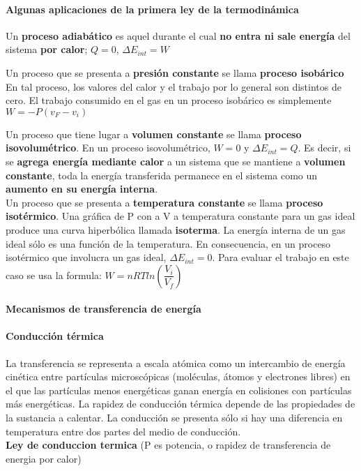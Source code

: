 \documentclass[10pt]{article}
\begin{document}
\paragraph{Algunas aplicaciones de la primera ley de la termodinámica}

Un \textbf{proceso adiabático} es aquel durante el cual \textbf{no entra ni sale energía} del sistema \textbf{por calor}; $Q = 0$, $\Delta E_{int} = W$\\
\linebreak

Un proceso que se presenta a \textbf{presión constante} se llama \textbf{proceso isobárico} En tal proceso, los valores del calor y el trabajo por lo general son distintos de cero. El trabajo consumido en el gas en un proceso isobárico es simplemente $W = -P(v_F - v_i)$\\
\linebreak

Un proceso que tiene lugar a \textbf{volumen constante} se llama \textbf{proceso isovolumétrico}. En un proceso isovolumétrico,
$W = 0$ y $\Delta E_{int} = Q$. Es decir, si se \textbf{agrega energía mediante calor} a un sistema que se mantiene a \textbf{volumen constante}, toda la energía transferida permanece en el sistema como un \textbf{aumento en su energía interna}.\\
\linebreak
Un proceso que se presenta a \textbf{temperatura constante} se llama \textbf{proceso isotérmico}. Una gráfica de P con a V a temperatura constante para un gas ideal produce una curva hiperbólica llamada \textbf{isoterma}. La energía interna de un gas ideal sólo es una función de la temperatura. En consecuencia, en un proceso isotérmico que involucra un gas ideal,
$\Delta E_{int}=0$. Para evaluar el trabajo en este caso se usa la formula: $W = n RT ln\left( \dfrac{V_i}{V_f} \right)$

\paragraph{Mecanismos de transferencia de energía}

\paragraph{Conducción térmica}

La transferencia se representa a escala atómica como un intercambio de energía cinética entre partículas microscópicas (moléculas, átomos y electrones libres) en el que las partículas menos energéticas ganan energía en colisiones con partículas más energéticas. La rapidez de conducción térmica depende de las propiedades de la sustancia a calentar. La conducción se presenta sólo si hay una diferencia en temperatura entre dos partes del medio de conducción.\\
\textbf{Ley de conduccion termica} (P es potencia, o rapidez de transferencia de energia por calor)
\end{document}
